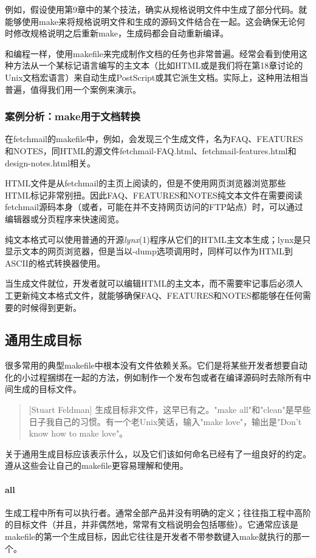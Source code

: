 \documentclass[12pt,oneside]{book}
\begin{document}
\begin{common-format}
例如，假设使用第9章中的某个技法，确实从规格说明文件中生成了部分代码。就能够使用make来将规格说明文件和生成的源码文件结合在一起。这会确保无论何时修改规格说明之后重新make，生成码都会自动重新编译。

和编程一样，使用makefile来完成制作文档的任务也非常普遍。经常会看到使用这种方法从一个某标记语言编写的主文本（比如HTML或是我们将在第18章讨论的Unix文档宏语言）来自动生成PostScript或其它派生文档。实际上，这种用法相当普遍，值得我们用一个案例来演示。

\subsubsection{案例分析：make用于文档转换}
在fetchmail的makefile中，例如，会发现三个生成文件，名为FAQ、FEATURES和NOTES，同HTML的源文件fetchmail-FAQ.html、fetchmail-features.html和design-notes.html相关。

HTML文件是从fetchmail的主页上阅读的，但是不使用网页浏览器浏览那些HTML标记非常别扭。因此FAQ、FEATURES和NOTES纯文本文件在需要阅读fetchmail源码本身（或者，可能在并不支持网页访问的FTP站点）时，可以通过编辑器或分页程序来快速阅览。

纯文本格式可以使用普通的开源\textit{lynx}(1)程序从它们的HTML主文本生成；lynx是只显示文本的网页浏览器，但是当以-dump选项调用时，同样可以作为HTML到ASCII的格式转换器使用。

当生成文件就位，开发者就可以编辑HTML的主文本，而不需要牢记事后必须人工更新纯文本格式文件，就能够确保FAQ、FEATURES和NOTES都能够在任何需要的时候得到更新。


\subsection{通用生成目标}
很多常用的典型makefile中根本没有文件依赖关系。它们是将某些开发者想要自动化的小过程捆绑在一起的方法，例如制作一个发布包或者在编译源码时去除所有中间生成的目标文件。

\begin{quote}[Stuart Feldman]
生成目标非文件，这早已有之。"make all"和"clean"是早些日子我自己的习惯。有一个老Unix笑话，输入"make love"，输出是"Don't know how to make love"。
\end{quote}

关于通用生成目标应该表示什么，以及它们该如何命名已经有了一组良好的约定。遵从这些会让自己的makefile更容易理解和使用。

\paragraph{all}
生成工程中所有可以执行者。通常全部产品并没有明确的定义；往往指工程中高阶的目标文件（并且，并非偶然地，常常有文档说明会包括哪些）。它通常应该是makefile的第一个生成目标，因此它往往是开发者不带参数键入make就执行的那一个。


\end{common-format}
\end{document}
